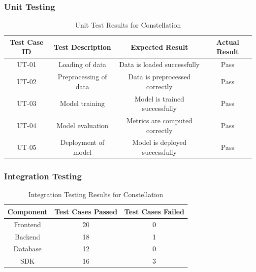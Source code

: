 \documentclass[12pt,a4paper]{report}     %
\begin{document}
\begin{normalsize}
{{{{\subsubsection{Unit Testing}

\begin{table}[h!]
\centering
\caption{Unit Test Results for Constellation}
\label{tab:unit-test-results}
\begin{tabular}{|c|c|c|c|}
\hline
\textbf{Test Case ID} & \textbf{Test Description} & \textbf{Expected Result} & \textbf{Actual Result} \\ \hline
UT-01 & Loading of data & Data is loaded successfully & Pass \\ \hline
UT-02 & Preprocessing of data & Data is preprocessed correctly & Pass \\ \hline
UT-03 & Model training & Model is trained successfully & Pass \\ \hline
UT-04 & Model evaluation & Metrics are computed correctly & Pass \\ \hline
UT-05 & Deployment of model & Model is deployed successfully & Pass \\ \hline
\end{tabular}
\end{table}

\subsubsection{Integration Testing}
\begin{table}[H]
\centering
\caption{Integration Testing Results for Constellation}
\label{tab:integration-testing}
\begin{tabular}{|c|c|c|}
\hline
\textbf{Component} & \textbf{Test Cases Passed} & \textbf{Test Cases Failed} \\ \hline
Frontend & 20 & 0 \\ \hline
Backend & 18 & 1 \\ \hline
Database & 12 & 0 \\ \hline
SDK & 16 & 3 \\ \hline

\end{tabular}
\end{table}

}}}}
\end{normalsize}
\end{document}
